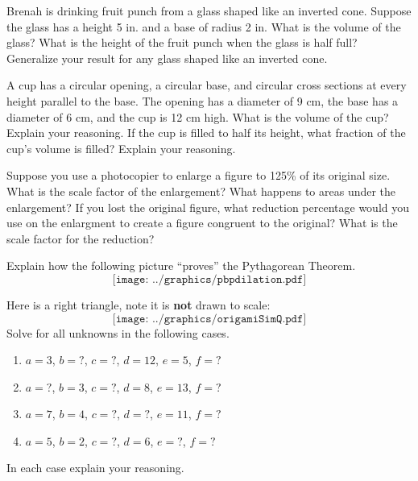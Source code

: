 \begin{prob}
Brenah is drinking fruit punch from a glass shaped like an inverted cone.  Suppose the glass has a height 5 in. and a base of radius 2 in.  What is the volume of the glass?  What is the height of the fruit punch when the glass is half full?  Generalize your result for any glass shaped like an inverted cone.  
\end{prob}

\begin{prob}
A cup has a circular opening, a circular base, and circular cross sections at every height parallel to the base.  The opening has a diameter of 9 cm, the base has a diameter of 6 cm, and the cup is 12 cm high.  
What is the volume of the cup?  Explain your reasoning.  
If the cup is filled to half its height, what fraction of the cup's volume is filled?  Explain your reasoning.  
\end{prob}

\begin{prob}
Suppose you use a photocopier to enlarge a figure to 125\% of its original size.  What is the scale factor of the enlargement?  What happens to areas under the enlargement?  If you lost the original figure, what reduction percentage would you use on the enlargment to create a figure congruent to the original?  What is the scale factor for the reduction?  
\end{prob}

\begin{prob}
Explain how the following picture ``proves'' the Pythagorean Theorem.
\[
\texttt{[image: ../graphics/pbpdilation.pdf]}
\]
\end{prob}

\begin{prob}
Here is a right triangle, note it is \textbf{not} drawn to scale:
\[
\texttt{[image: ../graphics/origamiSimQ.pdf]}
\]
Solve for all unknowns in the following cases.
\begin{enumerate}
\item $a = 3$, $b = ?$, $c = ?$, $d = 12$, $e = 5$, $f = ?$
\item $a = ?$, $b = 3$, $c = ?$, $d =8$, $e = 13$, $f = ?$
\item $a = 7$, $b = 4$, $c = ?$, $d =?$, $e = 11$, $f = ?$
\item $a = 5$, $b = 2$, $c = ?$, $d =6$, $e = ?$, $f = ?$
\end{enumerate}
In each case explain your reasoning.
\end{prob}


